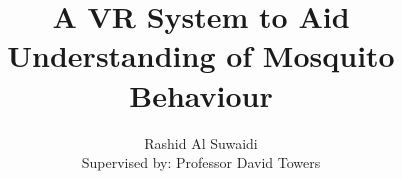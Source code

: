 \documentclass[a4paper,12pt,twoside]{report}
\begin{document}
\title{\LARGE {\bf A VR System to Aid Understanding of Mosquito Behaviour}\\
 \vspace*{6mm}
}

\author{Rashid Al Suwaidi  \\{\small Supervised by: Professor David Towers}}
\submitdate{\today}

\normallinespacing
\maketitle

%
%
%
%

\body
%
%


%

\appendix




\end{document}
